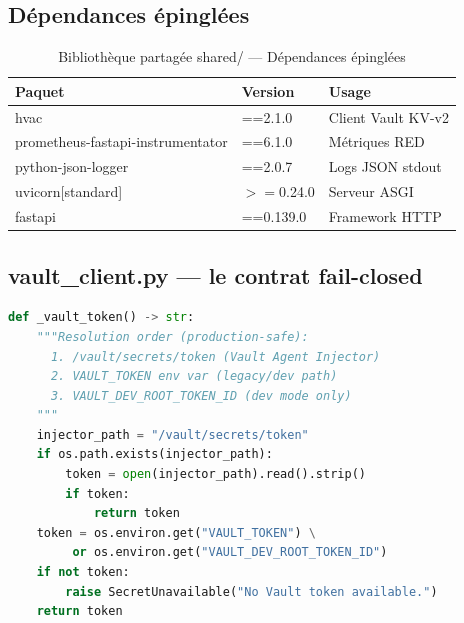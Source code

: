 \documentclass[12pt,a4paper,twoside,openright]{report}
\begin{document}
\subsection{Dépendances épinglées}
\begin{table}[H]
\centering\small
\caption{Bibliothèque partagée shared/ --- Dépendances épinglées}\label{tab:ch-bibliotheque-partagee-shared-dependances-epingle}
\begin{tabular}{@{}lll@{}}
\toprule
\textbf{Paquet} & \textbf{Version} & \textbf{Usage} \\
\midrule
hvac & ==2.1.0 & Client Vault KV-v2 \\
prometheus-fastapi-instrumentator & ==6.1.0 & Métriques RED \\
python-json-logger & ==2.0.7 & Logs JSON stdout \\
uvicorn[standard] & $>=$0.24.0 & Serveur ASGI \\
fastapi & ==0.139.0 & Framework HTTP \\
\bottomrule
\end{tabular}
\end{table}

\subsection{vault\_client.py --- le contrat fail-closed}
\begin{lstlisting}[language=Python,caption={Ordre de résolution du token (extrait documenté du code)}]
def _vault_token() -> str:
    """Resolution order (production-safe):
      1. /vault/secrets/token (Vault Agent Injector)
      2. VAULT_TOKEN env var (legacy/dev path)
      3. VAULT_DEV_ROOT_TOKEN_ID (dev mode only)
    """
    injector_path = "/vault/secrets/token"
    if os.path.exists(injector_path):
        token = open(injector_path).read().strip()
        if token:
            return token
    token = os.environ.get("VAULT_TOKEN") \
         or os.environ.get("VAULT_DEV_ROOT_TOKEN_ID")
    if not token:
        raise SecretUnavailable("No Vault token available.")
    return token
\end{lstlisting}
\end{document}
